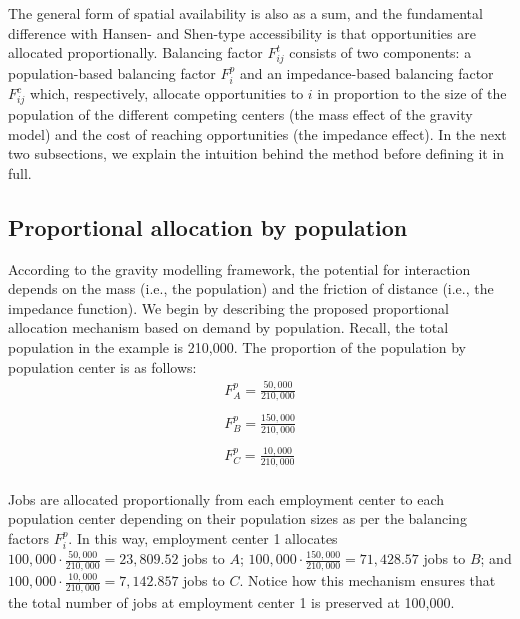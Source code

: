 \documentclass[]{elsarticle} %
\begin{document}
The general form of spatial availability is also as a sum, and the
fundamental difference with Hansen- and Shen-type accessibility is that
opportunities are allocated proportionally. Balancing factor
\(F^t_{ij}\) consists of two components: a population-based balancing
factor \(F^p_{i}\) and an impedance-based balancing factor \(F^c_{ij}\)
which, respectively, allocate opportunities to \(i\) in proportion to
the size of the population of the different competing centers (the mass
effect of the gravity model) and the cost of reaching opportunities (the
impedance effect). In the next two subsections, we explain the intuition
behind the method before defining it in full.

\hypertarget{proportional-allocation-by-population}{%
\subsection{Proportional allocation by
population}\label{proportional-allocation-by-population}}

According to the gravity modelling framework, the potential for
interaction depends on the mass (i.e., the population) and the friction
of distance (i.e., the impedance function). We begin by describing the
proposed proportional allocation mechanism based on demand by
population. Recall, the total population in the example is 210,000. The
proportion of the population by population center is as follows: \[
\begin{array}{l}
F^p_A = \frac{50,000}{210,000}\\
\\
F^p_B = \frac{150,000}{210,000}\\
\\
F^p_C = \frac{10,000}{210,000}\\
\end{array}
\]

Jobs are allocated proportionally from each employment center to each
population center depending on their population sizes as per the
balancing factors \(F^p_i\). In this way, employment center 1 allocates
\(100,000\cdot \frac{50,000}{210,000}= 23,809.52\) jobs to \(A\);
\(100,000\cdot \frac{150,000}{210,000}= 71,428.57\) jobs to \(B\); and
\(100,000\cdot \frac{10,000}{210,000}= 7,142.857\) jobs to \(C\). Notice
how this mechanism ensures that the total number of jobs at employment
center 1 is preserved at 100,000.
\end{document}
